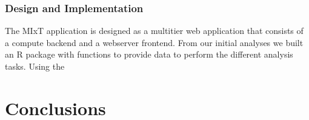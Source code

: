\subsubsection*{Design and Implementation}
The MIxT application is designed as a multitier web application that consists of
a compute backend and a webserver frontend. From our initial analyses we built
an R package with functions to provide data to perform the different
analysis tasks. Using the 




\section*{Conclusions}
